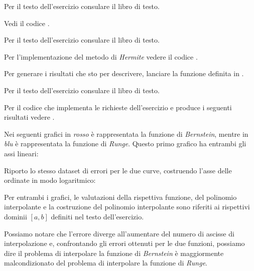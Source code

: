 \begin{exercise}[4.8]
Per il testo dell'esercizio consulare il libro di testo.
\end{exercise}
Vedi il codice . 

\begin{exercise}[4.9]
Per il testo dell'esercizio consulare il libro di testo.
\end{exercise}
Per l'implementazione del metodo di \emph{Hermite} vedere il codice
.

Per generare i risultati
che sto per descrivere, lanciare la funzione definita in
. 
\begin{center} 

\end{center}
\begin{center} 

\end{center}

\begin{exercise}[4.11]
Per il testo dell'esercizio consulare il libro di testo.
\end{exercise}
Per il codice che implementa le richieste dell'esercizio e produce i seguenti
risultati vedere .

Nei seguenti grafici in
\emph{rosso} \`e rappresentata la funzione di \emph{Bernstein}, mentre in \emph{blu} \`e rappresentata la funzione di
\emph{Runge}. Questo primo grafico ha entrambi gli assi lineari:
\begin{center}   

\end{center}
Riporto lo stesso dataset di errori per le due curve, costruendo l'asse delle
ordinate in modo logaritmico:
\begin{center}  

\end{center}
Per entrambi i grafici, le valutazioni della rispettiva funzione, del polinomio
interpolante e la costruzione del polinomio interpolante sono riferiti ai
rispettivi dominii $[a,b]$ definiti nel testo dell'esercizio.

Possiamo notare che l'errore diverge all'aumentare del numero di ascisse di
interpolazione e, confrontando gli errori ottenuti per le due funzioni, possiamo
dire il problema di interpolare la funzione di \emph{Bernstein} \`e maggiormente
malcondizionato del problema di interpolare la funzione di \emph{Runge}.






